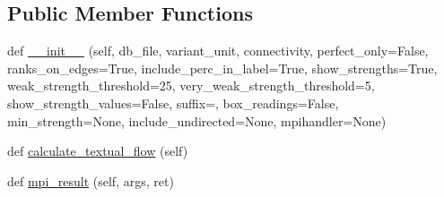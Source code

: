 \subsection*{Public Member Functions}
\begin{DoxyCompactItemize}
\item 
def \hyperlink{classCBGM_1_1lib_1_1textual__flow_1_1TextualFlow_ad70dfb8ec0a3602f6c9a5f962e8934e1}{\+\_\+\+\_\+init\+\_\+\+\_\+} (self, db\+\_\+file, variant\+\_\+unit, connectivity, perfect\+\_\+only=False, ranks\+\_\+on\+\_\+edges=True, include\+\_\+perc\+\_\+in\+\_\+label=True, show\+\_\+strengths=True, weak\+\_\+strength\+\_\+threshold=25, very\+\_\+weak\+\_\+strength\+\_\+threshold=5, show\+\_\+strength\+\_\+values=False, suffix=\textquotesingle{}\textquotesingle{}, box\+\_\+readings=False, min\+\_\+strength=None, include\+\_\+undirected=None, mpihandler=None)
\item 
def \hyperlink{classCBGM_1_1lib_1_1textual__flow_1_1TextualFlow_adc75c15bd885bfbd38c1a67c45acef88}{calculate\+\_\+textual\+\_\+flow} (self)
\item 
def \hyperlink{classCBGM_1_1lib_1_1textual__flow_1_1TextualFlow_af60312ac039b52328a2fca08923f4df8}{mpi\+\_\+result} (self, args, ret)
\end{DoxyCompactItemize}
